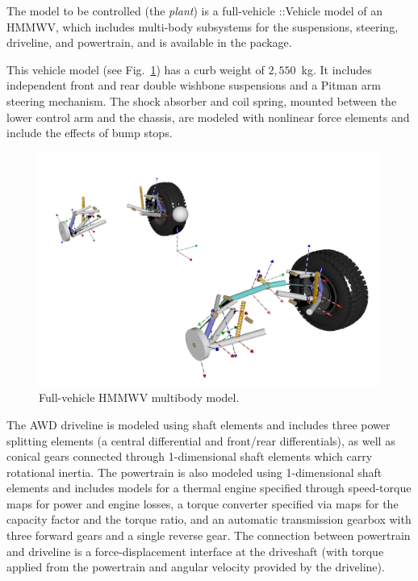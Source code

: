 \documentclass[12pt,onecolumn]{article}
\newcommand{\CHRONO}{{\sffamily{{Chrono}}}}
\newcommand{\ChronoVehicle}{{\sffamily{Chrono}}::Vehicle}
\begin{document}
The model to be controlled (the {\em plant}) is a full-vehicle {\ChronoVehicle} model of an HMMWV, which includes multi-body subsystems for the suspensions, steering, driveline, and powertrain, and is available in the {\CHRONO} package.

This vehicle model (see Fig.~\ref{fig:hmmwv}) has a curb weight of $2,550$~kg.
%
It includes independent front and rear double wishbone suspensions and a Pitman arm steering mechanism. The shock absorber and coil spring, mounted between the lower control arm and the chassis, are modeled with {\CHRONO} nonlinear force elements and include the effects of bump stops.
%
\begin{figure}
	\centering
	\includegraphics[width=\columnwidth]{Figs/hmmwv_bodies.png}
	\caption{\small Full-vehicle HMMWV multibody model.}  
	\label{fig:hmmwv}
\end{figure}

The AWD driveline is modeled using {\CHRONO} shaft elements and includes three power splitting elements (a central differential and front/rear differentials), as well as conical gears connected through 1-dimensional shaft elements which carry rotational inertia. 
%
The powertrain is also modeled using 1-dimensional shaft elements and includes models for a thermal engine specified through speed-torque maps for power and engine losses, a torque converter specified via maps for the capacity factor and the torque ratio, and an automatic transmission gearbox with three forward gears and a single reverse gear.
%
The connection between powertrain and driveline is a force-displacement interface at the driveshaft (with torque applied from the powertrain and angular velocity provided by the driveline).
\end{document}
